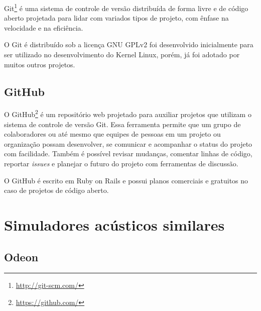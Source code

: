 Git\footnote{\url{http://git-scm.com/}} é uma sistema de controle de versão distribuída de forma livre e de código aberto  projetada para lidar com variados tipos de projeto, com ênfase na velocidade e na eficiência.

O Git é distribuído sob a licença GNU GPLv2 foi desenvolvido inicialmente para ser utilizado no desenvolvimento do Kernel Linux, porém, já foi adotado por muitos outros projetos.

\subsection{GitHub}

O GitHub\footnote{\url{https://github.com/}} é um repositório web projetado para auxiliar projetos que utilizam o sistema de controle de versão Git. Essa ferramenta permite que um grupo de colaboradores ou até mesmo que equipes de pessoas em um projeto ou organização possam desenvolver, se comunicar e acompanhar o status do projeto com facilidade. Também é possível revisar mudanças, comentar linhas de código, reportar \textit{issues} e planejar o futuro do projeto com ferramentas de discussão.

O GitHub é escrito em Ruby on Rails e possui planos comerciais e gratuitos no caso de projetos de código aberto.

\section{Simuladores acústicos similares}

\subsection{Odeon}

